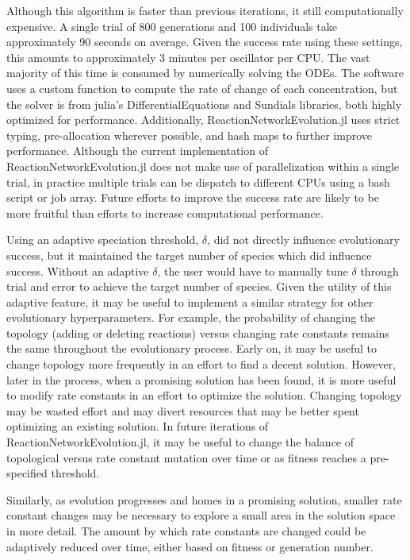 \documentclass[12pt]{report}
\begin{document}
Although this algorithm is faster than previous iterations, it still computationally expensive. A single trial of 800 generations and 100 individuals take approximately 90 seconds on average. Given the success rate using these settings, this amounts to approximately 3 minutes per oscillator per CPU. The vast majority of this time is consumed by numerically solving the ODEs. The software uses a custom function to compute the rate of change of each concentration, but the solver is from julia's DifferentialEquations and Sundials libraries, both highly optimized for performance. Additionally, ReactionNetworkEvolution.jl uses strict typing, pre-allocation wherever possible, and hash maps to further improve performance. Although the current implementation of ReactionNetworkEvolution.jl does not make use of parallelization within a single trial, in practice multiple trials can be dispatch to different CPUs using a bash script or job array. Future efforts to improve the success rate are likely to be more fruitful than efforts to increase computational performance.


Using an adaptive speciation threshold, $\delta$, did not directly influence evolutionary success, but it maintained the target number of species which did influence success. Without an adaptive $\delta$, the user would have to manually tune $\delta$ through trial and error to achieve the target number of species. Given the utility of this adaptive feature, it may be useful to implement a similar strategy for other evolutionary hyperparameters. For example, the probability of changing the topology (adding or deleting reactions) versus changing rate constants remains the same throughout the evolutionary process. Early on, it may be useful to change topology more frequently in an effort to find a decent solution. However, later in the process, when a promising solution has been found, it is more useful to modify rate constants in an effort to optimize the solution. Changing topology may be wasted effort and may divert resources that may be better spent optimizing an existing solution. In future iterations of ReactionNetworkEvolution.jl, it may be useful to change the balance of topological versus rate constant mutation over time or as fitness reaches a pre-specified threshold.

Similarly, as evolution progresses and homes in a promising solution, smaller rate constant changes may be necessary to explore a small area in the solution space in more detail. The amount by which rate constants are changed could be adaptively reduced over time, either based on fitness or generation number. 
\end{document}
